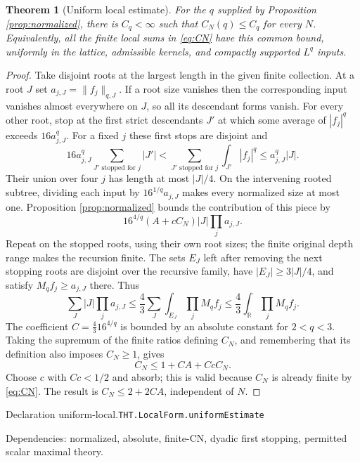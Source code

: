 \documentclass[11pt]{article}
\newtheorem{theorem}{Theorem}[section]
\theoremstyle{definition}
\newcommand{\R}{\mathbb R}
\numberwithin{equation}{section}
\newcommand{\bp}[3]{\par\smallskip\begingroup\footnotesize
\noindent\hypertarget{bp:#1}{\textsf{Declaration #1.}}\quad\nolinkurl{#2}\par
\noindent\textsf{Dependencies:} #3.\par\endgroup\smallskip}
\begin{document}
\begin{theorem}[Uniform local estimate]\label{thm:uniform-local}
For the $q$ supplied by Proposition \ref{prop:normalized}, there is $C_q<\infty$ such that $C_N(q)\le C_q$ for every $N$. Equivalently, all the finite local sums in \eqref{eq:CN} have this common bound, uniformly in the lattice, admissible kernels, and compactly supported $L^q$ inputs.
\end{theorem}
\begin{proof}
Take disjoint roots at the largest length in the given finite collection. At a root $J$ set $a_{j,J}=\|f_j\|_{q,J}$. If a root size vanishes then the corresponding input vanishes almost everywhere on $J$, so all its descendant forms vanish. For every other root, stop at the first strict descendants $J'$ at which some average of $|f_j|^q$ exceeds $16a_{j,J}^q$. For a fixed $j$ these first stops are disjoint and
\[
 16a_{j,J}^q\sum_{J'\text{ stopped for }j}|J'|
 <\sum_{J'\text{ stopped for }j}\int_{J'}|f_j|^q
 \le a_{j,J}^q|J|.
\]
Their union over four $j$ has length at most $|J|/4$. On the intervening rooted subtree, dividing each input by $16^{1/q}a_{j,J}$ makes every normalized size at most one. Proposition \ref{prop:normalized} bounds the contribution of this piece by
\[
 16^{4/q}(A+cC_N)|J|\prod_j a_{j,J}.
\]
Repeat on the stopped roots, using their own root sizes; the finite original depth range makes the recursion finite. The sets $E_J$ left after removing the next stopping roots are disjoint over the recursive family, have $|E_J|\ge3|J|/4$, and satisfy $M_qf_j\ge a_{j,J}$ there. Thus
\[
 \sum_J|J|\prod_j a_{j,J}
 \le\frac43\sum_J\int_{E_J}\prod_jM_qf_j
 \le\frac43\int_\R\prod_jM_qf_j.
\]
The coefficient $C=\frac43 16^{4/q}$ is bounded by an absolute constant for $2<q<3$. Taking the supremum of the finite ratios defining $C_N$, and remembering that its definition also imposes $C_N\ge1$, gives
\[
 C_N\le1+CA+CcC_N.
\]
Choose $c$ with $Cc<1/2$ and absorb; this is valid because $C_N$ is already finite by \eqref{eq:CN}. The result is $C_N\le2+2CA$, independent of $N$.
\end{proof}
\bp{uniform-local}{THT.LocalForm.uniformEstimate}{normalized, absolute, finite-CN, dyadic first stopping, permitted scalar maximal theory}
\end{document}

